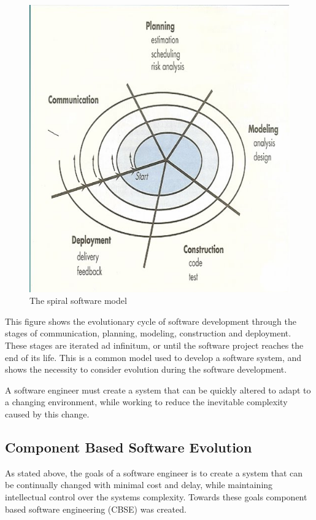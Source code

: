 \begin{figure}[htp]
\begin{center}
  \includegraphics[width=\textwidth]{backgroundpics/spiral}
  \caption{The spiral software model}
  \label{spiral}
\end{center}
\end{figure}

This figure shows the evolutionary cycle of software development through the stages of communication, planning, modeling, construction and deployment.
These stages are iterated ad infinitum, or until the software project reaches the end of its life. 
This is a common model used to develop a software system, and shows the necessity to consider evolution during the software development.  

A software engineer must create a system that can be quickly altered to adapt to a changing environment, 
while working to reduce the inevitable complexity caused by this change.

\subsection{Component Based Software Evolution}
As stated above, the goals of a software engineer is to create a system that can be continually changed with minimal cost and delay,
while maintaining intellectual control over the systems complexity.
Towards these goals component based software engineering (CBSE) was created.

